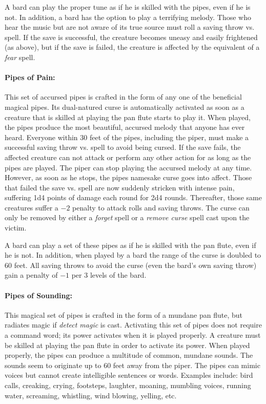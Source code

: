 \begin{multicols}{2}
A bard can play the proper tune as if he is skilled with the pipes, even if he is not.  In addition, a bard has the option to play a terrifying melody.  Those who hear the music but are not aware of its true source must roll a saving throw vs. spell.  If the save is successful, the creature becomes uneasy and easily frightened (as above), but if the save is failed, the creature is affected by the equivalent of a \textit{fear} spell. 

\paragraph{Pipes of Pain:} This set of accursed pipes is crafted in the form of any one of the beneficial magical pipes.  Its dual-natured curse is automatically activated as soon as a creature that is skilled at playing the pan flute starts to play it.  When played, the pipes produce the most beautiful, accursed melody that anyone has ever heard.  Everyone within 30 feet of the pipes, including the piper, must make a successful saving throw vs. spell to avoid being cursed.  If the save fails, the affected creature can not attack or perform any other action for as long as the pipes are played.   The piper can stop playing the accursed melody at any time.  However, as soon as he stops, the pipes namesake curse goes into affect.  Those that failed the save vs. spell are now suddenly stricken with intense pain, suffering 1d4 points of damage each round for 2d4 rounds.  Thereafter, those same creatures suffer a $-2$ penalty to attack rolls and saving throws.  The curse can only be removed by either a \textit{forget} spell or a \textit{remove curse} spell cast upon the victim.

A bard can play a set of these pipes as if he is skilled with the pan flute, even if he is not.  In addition, when played by a bard the range of the curse is doubled to 60 feet.  All saving throws to avoid the curse (even the bard's own saving throw) gain a penalty of $-1$ per 3 levels of the bard.

\paragraph{Pipes of Sounding:} This magical set of pipes is crafted in the form of a mundane pan flute, but radiates magic if \textit{detect magic} is cast.  Activating this set of pipes does not require a command word; its power activates when it is played properly.  A creature must be skilled at playing the pan flute in order to activate its power.  When played properly, the pipes can produce a multitude of common, mundane sounds.  The sounds seem to originate up to 60 feet away from the piper.  The pipes can mimic voices but cannot create intelligible sentences or words.  Examples include: bird calls, creaking, crying, footsteps, laughter, moaning, mumbling voices, running water, screaming, whistling, wind blowing, yelling, etc. 


\end{multicols}
